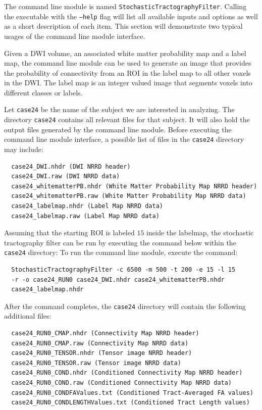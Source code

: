 \documentclass{InsightArticle}
\begin{document}
The command line module is named \texttt{StochasticTractographyFilter}.  Calling the executable with the \texttt{--help} flag will list all available inputs and options as well as a short description of each item.  This section will demonstrate two typical usages of the command line module interface.

Given a DWI volume, an associated white matter probability map and a label map, the command line module can be used to generate an image that provides the probability of connectivity from an ROI in the label map to all other voxels in the DWI.  The label map is an integer valued image that segments voxels into different classes or labels.

Let \texttt{case24} be the name of the subject we are interested in analyzing.  The directory \texttt{case24} contains all relevant files for that subject.  It will also hold the output files generated by the command line module.  Before executing the command line module interface, a possible list of files in the \texttt{case24} directory may include:
\begin{verbatim}
  case24_DWI.nhdr (DWI NRRD header)
  case24_DWI.raw (DWI NRRD data)
  case24_whitematterPB.nhdr (White Matter Probability Map NRRD header)
  case24_whitematterPB.raw (White Matter Probability Map NRRD data)
  case24_labelmap.nhdr (Label Map NRRD data)
  case24_labelmap.raw (Label Map NRRD data)
\end{verbatim}
Assuming that the starting ROI is labeled $15$ inside the labelmap, the stochastic tractography filter can be run by executing the command below within the \texttt{case24} directory: 
To run the command line module, execute the command:
\begin{verbatim}
  StochasticTractographyFilter -c 6500 -m 500 -t 200 -e 15 -l 15
  -r -o case24_RUN0 case24_DWI.nhdr case24_whitematterPB.nhdr
  case24_labelmap.nhdr
\end{verbatim}
After the command completes, the \texttt{case24} directory will contain the following additional files:
\begin{verbatim}
  case24_RUN0_CMAP.nhdr (Connectivity Map NRRD header)
  case24_RUN0_CMAP.raw (Connectivity Map NRRD data)
  case24_RUN0_TENSOR.nhdr (Tensor image NRRD header)
  case24_RUN0_TENSOR.raw (Tensor image NRRD data)
  case24_RUN0_COND.nhdr (Conditioned Connectivity Map NRRD header)
  case24_RUN0_COND.raw (Conditioned Connectivity Map NRRD data)
  case24_RUN0_CONDFAValues.txt (Conditioned Tract-Averaged FA values)
  case24_RUN0_CONDLENGTHValues.txt (Conditioned Tract Length values)
\end{verbatim}
\end{document}
